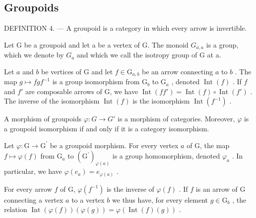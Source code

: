 \subsection{Groupoids}

DEFINITION 4. --- A groupoid is a category in which every arrow is invertible.

Let G be a groupoid and let a be a vertex of G. The monoid \(G_{a,a}\) is a group, which we denote by \(G_{a}\) and which we call the isotropy group of G at a.

Let \(a\) and \(b\) be vertices of G and let \(f \in \mathrm{G}_{a,b}\) be an arrow connecting \(a\) to \(b\) . The map \(g \mapsto fgf^{-1}\) is a group isomorphism from \(\mathrm{G}_b\) to \(\mathrm{G}_a\) , denoted \(\operatorname{Int}(f)\) . If \(f\) and \(f'\) are composable arrows of G, we have \(\operatorname{Int}(ff') = \operatorname{Int}(f) \circ \operatorname{Int}(f')\) . The inverse of the isomorphism \(\operatorname{Int}(f)\) is the isomorphism \(\operatorname{Int}(f^{-1})\) .

A morphism of groupoids \(\varphi\colon G\to G'\) is a morphism of categories. Moreover, \(\varphi\) is a groupoid isomorphism if and only if it is a category isomorphism.

Let \(\varphi\colon\mathrm{G}\to\mathrm{G}^{\prime}\) be a groupoid morphism. For every vertex \(a\) of G, the map \(f\mapsto\varphi(f)\) from \(\mathrm{G}_{a}\) to \((\mathrm{G}^{\prime})_{\varphi(a)}\) is a group homomorphism, denoted \(\varphi_{a}\) . In particular, we have \(\varphi(e_{a})=e_{\varphi(a)}\) .

For every arrow \(f\) of G, \(\varphi(f^{-1})\) is the inverse of \(\varphi(f)\) . If \(f\) is an arrow of G connecting a vertex \(a\) to a vertex \(b\) we thus have, for every element \(g \in \mathrm{G}_b\) , the relation \(\operatorname{Int}(\varphi(f))(\varphi(g)) = \varphi(\operatorname{Int}(f)(g))\) .


